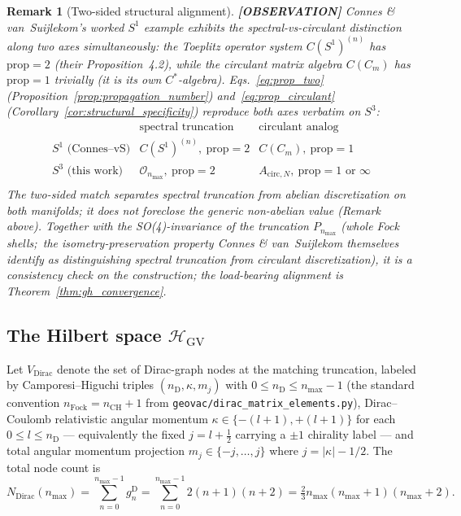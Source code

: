 \documentclass[11pt]{article}
\newtheorem{remark}{Remark}
\begin{document}
\begin{remark}[Two-sided structural alignment]
\label{rem:two_sided_alignment}
\textbf{[OBSERVATION]} Connes \& van~Suijlekom's worked $S^1$ example exhibits the
spectral-vs-circulant distinction along two axes simultaneously:
the Toeplitz operator system $C(S^1)^{(n)}$ has $\mathrm{prop} = 2$
(their Proposition~4.2), while the circulant matrix algebra
$C(C_m)$ has $\mathrm{prop} = 1$ trivially (it is its own
$C^*$-algebra).  Eqs.~\eqref{eq:prop_two}
(Proposition~\ref{prop:propagation_number}) and~\eqref{eq:prop_circulant}
(Corollary~\ref{cor:structural_specificity}) reproduce both axes
verbatim on $S^3$:
\[
\renewcommand{\arraystretch}{1.15}
\begin{array}{c|c|c}
 & \text{spectral truncation} & \text{circulant analog} \\ \hline
S^1 \text{ (Connes--vS)} & C(S^1)^{(n)},\ \mathrm{prop} = 2 &
   C(C_m),\ \mathrm{prop} = 1 \\
S^3 \text{ (this work)}  & \mathcal{O}_{n_{\max}},\ \mathrm{prop} = 2 &
   A_{\mathrm{circ}, N},\ \mathrm{prop} = 1 \text{ or } \infty \\
\end{array}
\]
The two-sided match separates spectral truncation from abelian
discretization on both manifolds; it does not foreclose the generic
non-abelian value (Remark above).  Together with the
SO(4)-invariance of the truncation $P_{n_{\max}}$ (whole Fock shells;\
the isometry-preservation property Connes \& van~Suijlekom themselves
identify as distinguishing spectral truncation from circulant
discretization),
it is a consistency check on the construction; the load-bearing
alignment is Theorem~\ref{thm:gh_convergence}.
\end{remark}

\subsection{The Hilbert space $\mathcal{H}_{\mathrm{GV}}$}

Let $V_{\mathrm{Dirac}}$ denote the set of Dirac-graph nodes at the
matching truncation, labeled by Camporesi--Higuchi triples
$(n_{\mathrm{D}}, \kappa, m_j)$ with $0 \le n_{\mathrm{D}} \le
n_{\max} - 1$ (the standard convention $n_{\mathrm{Fock}} = n_{\mathrm{CH}}
+ 1$ from \texttt{geovac/dirac\_matrix\_elements.py}), Dirac--Coulomb
relativistic angular momentum $\kappa \in \{-(l+1), +(l+1)\}$ for each
$0 \le l \le n_{\mathrm{D}}$ --- equivalently the fixed
$j = l + \tfrac12$ carrying a $\pm 1$ chirality label --- and total angular
momentum projection $m_j \in \{-j, \ldots, j\}$ where $j = |\kappa| - 1/2$.
The total
node count is
\[
   N_{\mathrm{Dirac}}(n_{\max}) = \sum_{n=0}^{n_{\max}-1}
     g_n^{\mathrm{D}} = \sum_{n=0}^{n_{\max}-1} 2(n+1)(n+2)
   = \tfrac{2}{3} n_{\max}(n_{\max}+1)(n_{\max}+2).
\]
\end{document}
